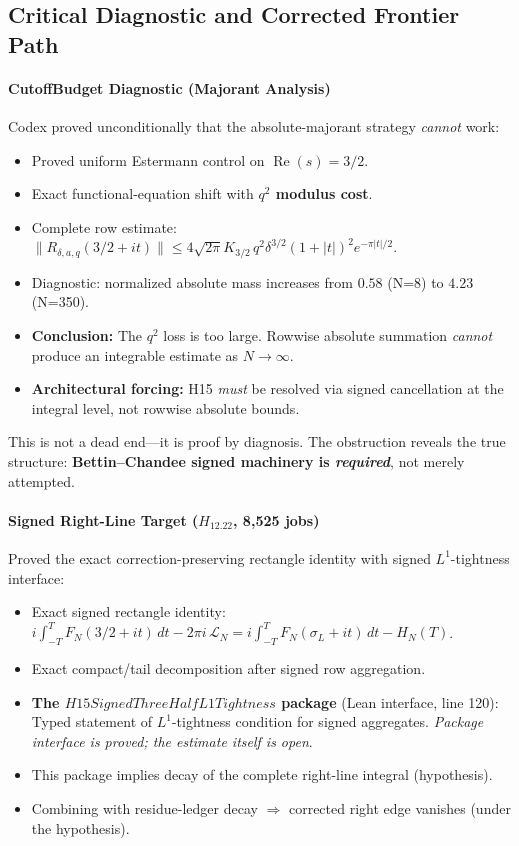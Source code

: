 \documentclass[11pt,a4paper]{article}
\theoremstyle{plain}
\theoremstyle{definition}
\theoremstyle{remark}
\DeclareMathOperator{\RePart}{Re}
\renewcommand{\Re}{\RePart}
\begin{document}
\subsection{Critical Diagnostic and Corrected Frontier Path}

\paragraph{CutoffBudget Diagnostic (Majorant Analysis)}

Codex proved unconditionally that the absolute-majorant strategy \emph{cannot} work:
\begin{itemize}[leftmargin=2em]
  \item Proved uniform Estermann control on $\Re(s)=3/2$.
  \item Exact functional-equation shift with \textbf{$q^2$ modulus cost}.
  \item Complete row estimate: $\|R_{\delta,a,q}(3/2+it)\| \le 4\sqrt{2\pi}K_{3/2}\, q^2\delta^{3/2}(1+|t|)^2e^{-\pi|t|/2}$.
  \item Diagnostic: normalized absolute mass increases from $0.58$ (N=8) to $4.23$ (N=350).
  \item \textbf{Conclusion:} The $q^2$ loss is too large. Rowwise absolute summation \emph{cannot} produce an integrable estimate as $N \to \infty$.
  \item \textbf{Architectural forcing:} H15 \emph{must} be resolved via signed cancellation at the integral level, not rowwise absolute bounds.
\end{itemize}

This is not a dead end---it is proof by diagnosis. The obstruction reveals the true structure: \textbf{Bettin--Chandee signed machinery is \emph{required}}, not merely attempted.

\paragraph{Signed Right-Line Target ($H_{12.22}$, 8,525 jobs)}

Proved the exact correction-preserving rectangle identity with signed $L^1$-tightness interface:
\begin{itemize}[leftmargin=2em]
  \item Exact signed rectangle identity: $i\int_{-T}^{T}F_N(3/2+it)\,dt - 2\pi i\,\mathcal{L}_N = i\int_{-T}^{T}F_N(\sigma_L+it)\,dt - H_N(T)$.
  \item Exact compact/tail decomposition after signed row aggregation.
  \item \textbf{The $H15SignedThreeHalfL1Tightness$ package} (Lean interface, line 120): Typed statement of $L^1$-tightness condition for signed aggregates. \emph{Package interface is proved; the estimate itself is open}.
  \item This package implies decay of the complete right-line integral (hypothesis).
  \item Combining with residue-ledger decay $\Rightarrow$ corrected right edge vanishes (under the hypothesis).
\end{itemize}
\end{document}
